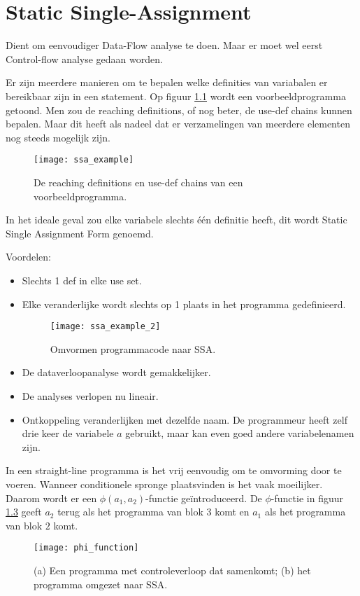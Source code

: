 \chapter{Static Single-Assignment}
Dient om eenvoudiger Data-Flow analyse te doen. Maar er moet wel eerst Control-flow analyse gedaan worden.

Er zijn meerdere manieren om te bepalen welke definities van variabalen er bereikbaar zijn in een statement. Op figuur \ref{fig:ssa_example} wordt een voorbeeldprogramma getoond. Men zou de reaching definitions, of nog beter, de use-def chains kunnen bepalen. Maar dit heeft als nadeel dat er verzamelingen van meerdere elementen nog steeds mogelijk zijn.

\begin{figure}[ht]
	\centering
	\texttt{[image: ssa\_example]}
	\caption{De reaching definitions en use-def chains van een voorbeeldprogramma.}
	\label{fig:ssa_example}
\end{figure}

In het ideale geval zou elke variabele slechts één definitie heeft, dit wordt Static Single Assignment Form genoemd.

Voordelen:
\begin{itemize}
	\item Slechts 1 def in elke use set.
	\item Elke veranderlijke wordt slechts op 1 plaats in het programma gedefinieerd.
	\begin{figure}[ht]
		\centering
		\texttt{[image: ssa\_example\_2]}
		\caption{Omvormen programmacode naar SSA.}
		\label{fig:ssa_example_2}
	\end{figure}
	\item De dataverloopanalyse wordt gemakkelijker.
	\item De analyses verlopen nu lineair.
	\item Ontkoppeling veranderlijken met dezelfde naam. De programmeur heeft zelf drie keer de variabele $a$ gebruikt, maar kan even goed andere variabelenamen zijn.
\end{itemize}

In een straight-line programma is het vrij eenvoudig om te omvorming door te voeren. Wanneer conditionele spronge plaatsvinden is het vaak moeilijker. Daarom wordt er een $\phi(a_1, a_2)$-functie geïntroduceerd. De $\phi$-functie in figuur \ref{fig:phi_function} geeft $a_2$ terug als het programma van blok $3$ komt en $a_1$ als het programma van blok $2$ komt. 
\begin{figure}[ht]
	\centering
	\texttt{[image: phi\_function]}
	\caption{(a) Een programma met controleverloop dat samenkomt; (b) het programma omgezet naar SSA.}
	\label{fig:phi_function}
\end{figure}



